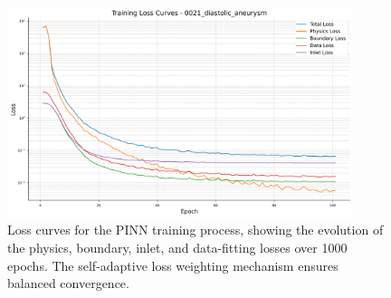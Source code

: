 \documentclass[12pt, a4paper]{article}
\begin{document}
\begin{figure}[H]
    \centering
    \scriptsize
    \includegraphics[width=0.9\textwidth]{0021_diastolic_aneurysm/0021_diastolic_aneurysm/loss_curves_0021_diastolic_aneurysm.png}
    \caption{Loss curves for the PINN training process, showing the evolution of the physics, boundary, inlet, and data-fitting losses over 1000 epochs. The self-adaptive loss weighting mechanism ensures balanced convergence.}
    \label{fig:loss_curves1}
\end{figure}



\end{document}
